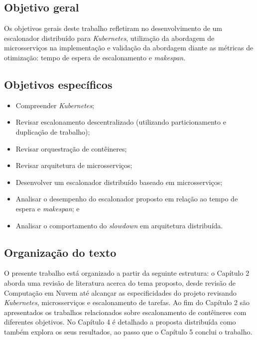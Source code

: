 \documentclass[
	12pt,				%
	openright,			%
	oneside,			%
	a4paper,			%
	brazil				%
	]{abntex2}
\providecommand{\DIFaddtex}[1]{{\protect\color{blue}\uwave{#1}}} %
\providecommand{\DIFaddbegin}{} %
\providecommand{\DIFaddend}{} %
\providecommand{\DIFadd}[1]{\texorpdfstring{\DIFaddtex{#1}}{#1}} %
\newcommand{\DIFaddincludegraphics}[2][]{{\color{blue}\fbox{\DIFOincludegraphics[#1]{#2}}}} %
\DeclareRobustCommand{\DIFaddbegin}{\DIFOaddbegin \let\includegraphics\DIFaddincludegraphics} %
\DeclareRobustCommand{\DIFaddend}{\DIFOaddend \let\includegraphics\DIFOincludegraphics} %
\begin{document}
\subsection{Objetivo geral}
\label{objgeral}

Os objetivos gerais deste trabalho refletiram no desenvolvimento de um escalonador distribuído para \textit{Kubernetes}, utilização da abordagem de microsserviços na implementação e validação da abordagem diante as métricas de otimização: tempo de espera de escalonamento e \textit{makespan}.

\subsection{Objetivos específicos}
\label{objesp}

\begin{itemize}
    \item Compreender \textit{Kubernetes};
    \item Revisar escalonamento descentralizado (utilizando particionamento e duplicação de trabalho);
    \item Revisar orquestração de contêineres;
    \item Revisar arquitetura de microsserviços;
    \item Desenvolver um escalonador distribuído baseado em microsserviços;
    \item Analisar o desempenho do escalonador proposto em relação ao tempo de espera e \textit{makespan}; e
    \item Analisar o comportamento do \textit{slowdown} em arquitetura distribuída.
\end{itemize}

\newpage
\subsection{Organização do texto}
\DIFaddbegin 

\DIFadd{\textcolor{red}{TODO: atualizar com todos os capítulos}
}

\DIFaddend O presente trabalho está organizado a partir da seguinte estrutura: o Capítulo 2 aborda uma revisão de literatura acerca do tema proposto, desde revisão de Computação em Nuvem até alcançar as especificidades do projeto revisando \textit{Kubernetes}, microsserviços e escalonamento de tarefas. Ao fim do Capítulo 2 são apresentados os trabalhos relacionados sobre escalonamento de contêineres com diferentes objetivos. No Capítulo 4 é detalhado a proposta distribuída como também explora os seus resultados, ao passo que o Capítulo 5 conclui o trabalho.
\end{document}
